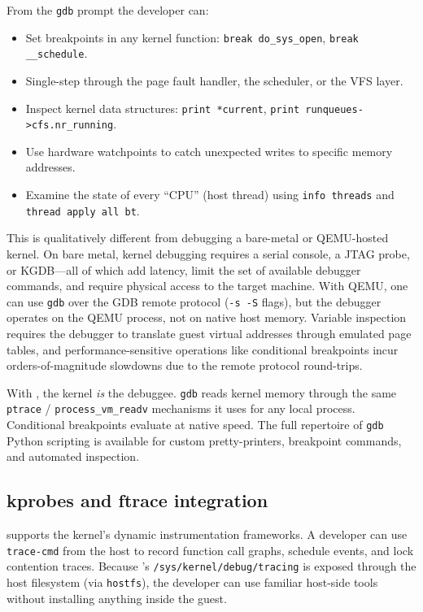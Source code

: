 From the \texttt{gdb} prompt the developer can:

\begin{itemize}[leftmargin=2em]
  \item Set breakpoints in any kernel function:
        \texttt{break do\_sys\_open}, \texttt{break \_\_schedule}.
  \item Single-step through the page fault handler, the scheduler,
        or the VFS layer.
  \item Inspect kernel data structures: \texttt{print *current},
        \texttt{print runqueues->cfs.nr\_running}.
  \item Use hardware watchpoints to catch unexpected writes to specific
        memory addresses.
  \item Examine the state of every ``CPU'' (host thread) using
        \texttt{info threads} and \texttt{thread apply all bt}.
\end{itemize}

This is qualitatively different from debugging a bare-metal or
QEMU-hosted kernel.  On bare metal, kernel debugging requires a serial
console, a JTAG probe, or KGDB---all of which add latency, limit the
set of available debugger commands, and require physical access to the
target machine.  With QEMU, one can use \texttt{gdb} over the GDB
remote protocol (\texttt{-s -S} flags), but the debugger operates on
the QEMU process, not on native host memory.  Variable inspection
requires the debugger to translate guest virtual addresses through
emulated page tables, and performance-sensitive operations like
conditional breakpoints incur orders-of-magnitude slowdowns due to
the remote protocol round-trips.

With \UML{}, the kernel \emph{is} the debuggee.  \texttt{gdb} reads
kernel memory through the same \texttt{ptrace} / \texttt{process\_vm\_readv}
mechanisms it uses for any local process.  Conditional breakpoints
evaluate at native speed.  The full repertoire of \texttt{gdb} Python
scripting is available for custom pretty-printers, breakpoint commands,
and automated inspection.

\subsection{kprobes and ftrace integration}

\UML{} supports the kernel's dynamic instrumentation frameworks.  A
developer can use \texttt{trace-cmd} from the host to record function
call graphs, schedule events, and lock contention traces.  Because
\UML{}'s \texttt{/sys/kernel/debug/tracing} is exposed through the
host filesystem (via \texttt{hostfs}), the developer can use familiar
host-side tools without installing anything inside the guest.


